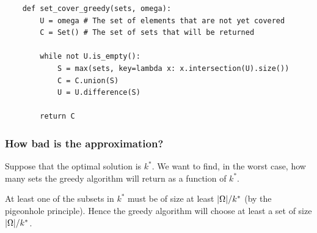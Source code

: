 \documentclass[12pt]{extarticle}
\begin{document}
\begin{verbatim}
    def set_cover_greedy(sets, omega):
        U = omega # The set of elements that are not yet covered
        C = Set() # The set of sets that will be returned

        while not U.is_empty():
            S = max(sets, key=lambda x: x.intersection(U).size())
            C = C.union(S)
            U = U.difference(S)

        return C
\end{verbatim}


\subsubsection{How bad is the approximation?}

Suppose that the optimal solution is $k^*$. We want to find, in the worst case, how many sets the greedy algorithm will return as a function of $k^*$.

At least one of the subsets in $k^*$ must be of size at least $\abs{\Omega} / k^*$ (by the pigeonhole principle).
Hence the greedy algorithm will choose at least a set of size $\abs{\Omega} / k^*$.
\end{document}
